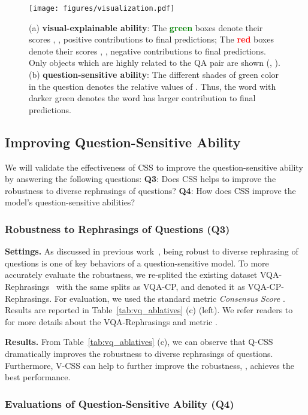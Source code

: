 \documentclass[10pt,twocolumn,letterpaper]{article}
\begin{document}
\begin{figure*}[htbp]
	\centering
	\texttt{[image: figures/visualization.pdf]}
	\vspace{-0.5em}
	\caption{(a) \textbf{visual-explainable ability}: The \textcolor{green}{\textbf{green}} boxes denote their scores , \ie, positive contributions to final predictions; The \textcolor{red}{\textbf{red}} boxes denote their scores , \ie, negative contributions to final predictions. Only objects which are highly related to the QA pair are shown (\ie, ). (b) \textbf{question-sensitive ability}: The different shades of green color in the question denotes the relative values of . Thus, the word with darker green denotes the word has larger contribution to final predictions.}
	\label{fig:5}
\end{figure*}

\subsection{Improving Question-Sensitive Ability}
We will validate the effectiveness of CSS to improve the question-sensitive ability by answering the following questions: \textbf{Q3}: Does CSS helps to improve the robustness to diverse rephrasings of questions? \textbf{Q4}: How does CSS improve the model's question-sensitive abilities?

\subsubsection{Robustness to Rephrasings of Questions (Q3)}
\noindent\textbf{Settings.} As discussed in previous work~\cite{shah2019cycle}, being robust to diverse rephrasing of questions is one of key behaviors of a question-sensitive model. To more accurately evaluate the robustness, we re-splited the existing dataset VQA-Rephrasings~\cite{shah2019cycle} with the same splits as VQA-CP, and denoted it as VQA-CP-Rephrasings. For evaluation, we used the standard metric \emph{Consensus Score} . Results are reported in Table~\ref{tab:vq_ablatives} (c) (left). We refer readers to~\cite{shah2019cycle} for more details about the VQA-Rephrasings and metric .

\noindent\textbf{Results.} From Table~\ref{tab:vq_ablatives} (c), we can observe that Q-CSS dramatically improves the robustness to diverse rephrasings of questions. Furthermore, V-CSS can help to further improve the robustness, \ie,  achieves the best performance.


\subsubsection{Evaluations of Question-Sensitive Ability (Q4)}
\end{document}
